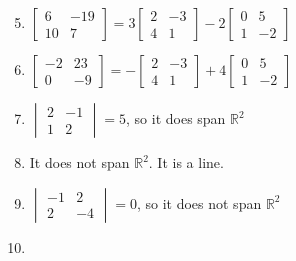 \documentclass[12pt]{article}
\begin{document}
\begin{enumerate}
    \setcounter{enumi}{4}

  \item $\begin{bmatrix} 6 & -19\\ 10 & 7  \end{bmatrix}=3\begin{bmatrix} 2 & -3\\ 4 & 1 \end{bmatrix}-2\begin{bmatrix} 0 & 5\\ 1 & -2 \end{bmatrix}$

    \setcounter{enumi}{6}

  \item $\begin{bmatrix} -2 & 23\\ 0 & -9 \end{bmatrix}=-\begin{bmatrix} 2 & -3\\ 4 & 1\end{bmatrix}+4\begin{bmatrix}0 & 5\\ 1 & -2 \end{bmatrix}$

    \setcounter{enumi}{8}

  \item $\begin{vmatrix} 2 & -1\\ 1 & 2 \end{vmatrix}=5$, so it does span $\mathbb{R}^2$

    \setcounter{enumi}{12}

  \item It does not span $\mathbb{R}^2$. It is a line.

    \setcounter{enumi}{14}

  \item $\begin{vmatrix} -1 & 2\\ 2 & -4 \end{vmatrix}=0$, so it does not span $\mathbb{R}^2$

    \setcounter{enumi}{18}

  \item


\end{enumerate}
\end{document}
